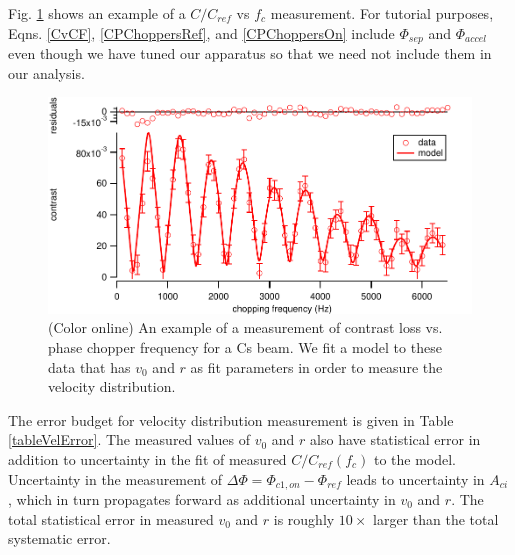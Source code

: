 \documentclass[twocolumn,prl,showpacs,superscriptaddress]{revtex4-1}   %
\newcommand{\figref}[1]{Fig. \ref{#1}}
\begin{document}
\figref{CvCFExample} shows an example of a $C/C_{ref}$ vs $f_c$ measurement. 
For tutorial purposes, Eqns. \eqref{CvCF}, \eqref{CPChoppersRef}, and \eqref{CPChoppersOn} include $\Phi_{sep}$ and $\Phi_{accel}$ even though we have tuned our apparatus so that we need not include them in our analysis.

\begin{figure}
\includegraphics[width=\linewidth,keepaspectratio]{CvCF_150420_o.pdf}
\caption{\label{CvCFExample}(Color online) An example of a measurement of contrast loss vs. phase chopper frequency for a Cs beam. We fit a model to these data that has $v_0$ and $r$ as fit parameters in order to measure the velocity distribution.}
\end{figure}
	
The error budget for velocity distribution measurement is given in Table \ref{tableVelError}. The measured values of $v_0$ and $r$ also have statistical error in addition to uncertainty in the fit of measured $C/C_{ref}(f_c)$ to the model. Uncertainty in the measurement of $\Delta\Phi = \Phi_{c1,on} - \Phi_{ref}$ leads to uncertainty in $A_{ci}$, which in turn propagates forward as additional uncertainty in $v_0$ and $r$. The total statistical error in measured $v_0$ and $r$ is roughly $10\times$ larger than the total systematic error.
\end{document}
